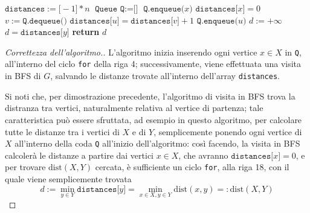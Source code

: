 \documentclass[a4paper, 12pt]{report}
\begin{document}
    \begin{algorithm}[H]
        \caption{
            Dato un grafo $G$, rappresentato attraverso liste di adiacenza, e due suoi sottoinsiemi di vertici $X, Y \subseteq V(G)$, l'algoritmo restituisce $\mathrm{dist}(X, Y)$.\\
            \textbf{Input}: $G$ grafo, rappresentato attraverso liste di adiacenza; $X, Y \subseteq V(G)$ sottoinsiemi di vertici di $G$.\\
            \textbf{Output}: $\mathrm{dist}(X, Y)$.
        }

        \begin{algorithmic}[1]
                \State $\texttt{distances}:=\texttt{[}-1\texttt{]} * n$
                \State $\texttt{Queue Q} := \texttt{[}\texttt{]}$
                    \State $\texttt{Q.enqueue(}x\texttt{)}$
                    \State $\texttt{distances[}x\texttt{]} = 0$ 
                \EndFor
                    \State $v := \texttt{Q.dequeue()}$
                         
                            \State $\texttt{distances[}u\texttt{]}=\texttt{distances[}v\texttt{]} + 1$
                            \State $\texttt{Q.enqueue(}u\texttt{)}$
                        \EndIf
                    \EndFor
                \EndWhile
                \State $d := + \infty$
                        \State $d = \texttt{distances[}y\texttt{]}$
                    \EndIf
                \EndFor
                \State \textbf{return} $d$
            \EndFunction
        \end{algorithmic}
    \end{algorithm}

    \begin{proof}[Correttezza dell'algoritmo.]
        L'algoritmo inizia inserendo ogni vertice $x \in X$ in \texttt{Q}, all'interno del ciclo \texttt{for} della riga 4; successivamente, viene effettuata una visita in BFS di $G$, salvando le distanze trovate all'interno dell'array \texttt{distances}.

        Si noti che, per dimostrazione precedente, l'algoritmo di visita in BFS trova la distranza tra vertici, naturalmente relativa al vertice di partenza; tale caratteristica può essere sfruttata, ad esempio in questo algoritmo, per calcolare tutte le distanze tra i vertici di $X$ e di $Y$, semplicemente ponendo ogni vertice di $X$ all'interno della coda \texttt{Q} all'inizio dell'algoritmo: così facendo, la visita in BFS calcolerà le distanze a partire dai vertici $x \in X$, che avranno $\texttt{distances[}x\texttt{]} = 0$, e per trovare $\mathrm{dist}(X, Y)$ cercata, è sufficiente un ciclo \texttt{for}, alla riga 18, con il quale viene semplicemente trovata $$\displaystyle d := \min_{y \in Y}{\texttt{distances[}y\texttt{]}} = \min_{x \in X, y \in Y}{\mathrm{dist}(x, y)} =: \mathrm{dist}(X, Y)$$
    \end{proof}
\end{document}
